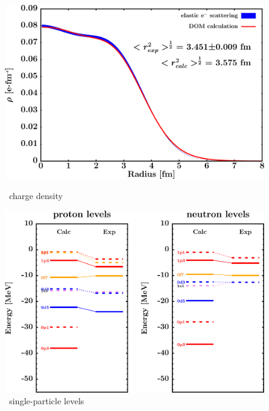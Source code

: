 \begin{figure}[hbtp]
    \centering
    \begin{minipage}{0.42\textwidth}
        \centering
        \includegraphics[width=\textwidth]{figures/ca48_chargeDensity.png}
        \caption*{\caEight\ charge density}
        \label{DOMFitData_ca48_chargeDensity}
    \end{minipage}\hspace{6pt}
    \begin{minipage}{0.42\textwidth}
        \centering
        \includegraphics[width=\textwidth]{figures/ca48_SPLevels.png}
        \caption*{\caEight\ single-particle levels}
        \label{DOMFitData_ca48_SPLevels}
    \end{minipage}
\end{figure}
